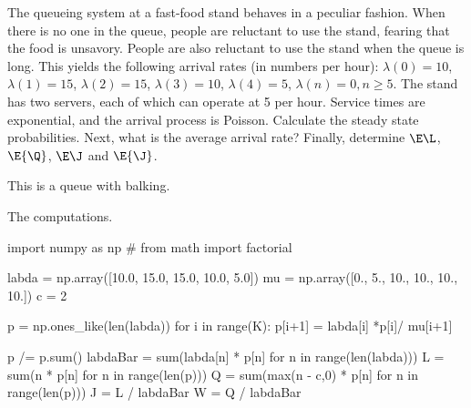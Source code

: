 \begin{exercise}[Hall 5.8]\label{ex:39}
The queueing system at a fast-food stand behaves in a peculiar fashion.
 When there is no one in the queue, people are reluctant to use the stand, fearing that the food is unsavory.
 People are also reluctant to use the stand when the queue is long.
 This yields the following arrival rates (in numbers per hour): $\lambda(0) = 10$, $\lambda(1)=15$, $\lambda(2)=15$, $\lambda(3)=10$, $\lambda(4)=5$, $\lambda(n)=0, n\geq 5$.
 The stand has two servers, each of which can operate at 5 per hour.
 Service times are exponential, and the arrival process is Poisson.
 Calculate the steady state probabilities.
 Next, what is the average arrival rate?
 Finally, determine $\E \L$, $\E{\Q}$, $\E \J$ and $\E{\J}$.
\begin{hint}
This is a queue with balking.
\end{hint}
\begin{solution}
The computations.
\begin{pyblock}
import numpy as np
# from math import factorial

labda = np.array([10.0, 15.0, 15.0, 10.0, 5.0])
mu = np.array([0., 5., 10., 10., 10., 10.])
c = 2

p = np.ones_like(len(labda))
for i in range(K):
    p[i+1] = labda[i] *p[i]/ mu[i+1]

p /= p.sum()
labdaBar = sum(labda[n] * p[n] for n in range(len(labda)))
L = sum(n * p[n] for n in range(len(p)))
Q = sum(max(n - c,0) * p[n] for n in range(len(p)))
J = L / labdaBar
W = Q / labdaBar
\end{pyblock}

\end{solution}
\end{exercise}

